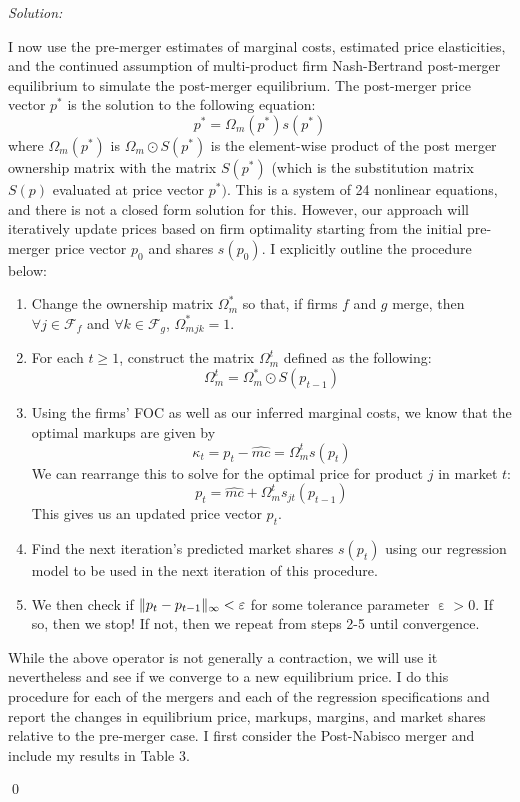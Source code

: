 \documentclass[12pt]{article}
\DeclarePairedDelimiter\norm{\lVert}{\rVert}%
\DeclareMathOperator{\eps}{\varepsilon}
\newenvironment{sol}
    {\emph{Solution:}
    }
    {
    \qed
    }
\begin{document}
\begin{sol}
I now use the pre-merger estimates of marginal costs, estimated price elasticities, and the continued assumption of multi-product firm Nash-Bertrand post-merger equilibrium to simulate the post-merger equilibrium. The post-merger price vector $p^*$ is the solution to the following equation:
\[p^* = \Omega_m(p^*) s(p^*)\]
where $\Omega_m(p^*)$ is $\Omega_m \odot S(p^*)$ is the element-wise product of the post merger ownership matrix with the matrix $S(p^*)$ (which is the substitution matrix $S(p)$ evaluated at price vector $p^*)$. This is a system of 24 nonlinear equations, and there is not a closed form solution for this. However, our approach will iteratively update prices based on firm optimality starting from the initial pre-merger price vector $p_0$ and shares $s(p_0)$. I explicitly outline the procedure below:
\begin{enumerate}
    \item Change the ownership matrix $\Omega_m^*$ so that, if firms $f$ and $g$ merge, then $\forall j \in \mathcal{F}_f$ and $\forall k \in \mathcal{F}_g$, $\Omega_m^*_{jk} = 1$.
    \item For each $t \geq 1$, construct the matrix $\Omega_m^t$ defined as the following:
    \[\Omega_m^t = \Omega_m^* \odot S(p_{t-1})\]
    \item Using the firms' FOC as well as our inferred marginal costs, we know that the optimal markups are given by
    \[\kappa_t = p_t - \hat{mc} = \Omega_m^t s(p_t)\]
    We can rearrange this to solve for the optimal price for product $j$ in market $t$:
    \[p_{t} = \hat{mc} + \Omega_m^t s_{jt}(p_{t-1})\]
    This gives us an updated price vector $p_t$.
    \item Find the next iteration's predicted market shares $s(p_{t})$ using our regression model to be used in the next iteration of this procedure.
    \item We then check if $\norm{p_t - p_{t-1}}_{\infty}< \varepsilon$ for some tolerance parameter $\eps > 0$. If so, then we stop! If not, then we repeat from steps 2-5 until convergence.
\end{enumerate}
While the above operator is not generally a contraction, we will use it nevertheless and see if we converge to a new equilibrium price. I do this procedure for each of the mergers and each of the regression specifications and report the changes in equilibrium price, markups, margins, and market shares relative to the pre-merger case. I first consider the Post-Nabisco merger and include my results in Table 3.

\end{sol}
\end{document}
